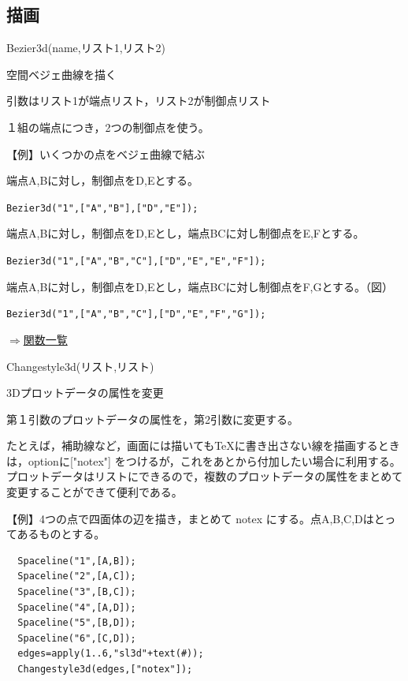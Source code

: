 \documentclass[papersize,a4paper,12pt,uplatex]{jsarticle}
\begin{document}
\subsection{描画}
\begin{description}

\hypertarget{bezier3d}{}
\item[関数]  Bezier3d(name,リスト1,リスト2)
\item[機能]  空間ベジェ曲線を描く
\item[説明]  引数はリスト1が端点リスト，リスト2が制御点リスト

１組の端点につき，2つの制御点を使う。

\vspace{\baselineskip}
【例】いくつかの点をベジェ曲線で結ぶ

  端点A,Bに対し，制御点をD,Eとする。
  
    \verb|Bezier3d("1",["A","B"],["D","E"]);| \vspace{\baselineskip}

  端点A,Bに対し，制御点をD,Eとし，端点BCに対し制御点をE,Fとする。
  
    \verb|Bezier3d("1",["A","B","C"],["D","E","E","F"]);|
    
 端点A,Bに対し，制御点をD,Eとし，端点BCに対し制御点をF,Gとする。（図）
 
    \verb|Bezier3d("1",["A","B","C"],["D","E","F","G"]);|
    
    \begin{center}  \end{center}

\begin{flushright} \hyperlink{functionlist}{$\Rightarrow$関数一覧}\end{flushright}

\hypertarget{changestyle3d}{}
\item[関数]  Changestyle3d(リスト,リスト)
\item[機能]  3Dプロットデータの属性を変更
\item[説明]  第１引数のプロットデータの属性を，第2引数に変更する。

たとえば，補助線など，画面には描いてもTeXに書き出さない線を描画するときは，optionに["notex"] をつけるが，これをあとから付加したい場合に利用する。プロットデータはリストにできるので，複数のプロットデータの属性をまとめて変更することができて便利である。

\vspace{\baselineskip}
【例】4つの点で四面体の辺を描き，まとめて notex にする。点A,B,C,Dはとってあるものとする。
\begin{verbatim}
  Spaceline("1",[A,B]);
  Spaceline("2",[A,C]);
  Spaceline("3",[B,C]);
  Spaceline("4",[A,D]);
  Spaceline("5",[B,D]);
  Spaceline("6",[C,D]);
  edges=apply(1..6,"sl3d"+text(#));
  Changestyle3d(edges,["notex"]);
\end{verbatim}


\end{description}
\end{document}
